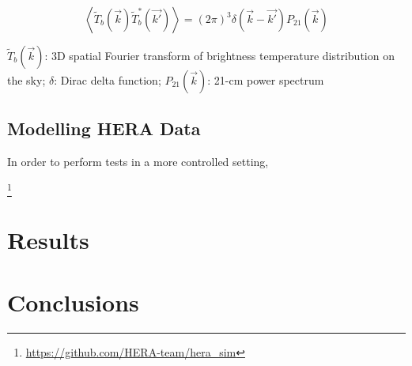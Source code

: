 \documentclass[12pt]{article}
\begin{document}
\begin{equation}
\left\langle \widetilde{T}_b\left(\vec{k}\right) \widetilde{T}_b^*\left(\vec{k'}\right) \right\rangle = \left(2\pi\right)^3 \delta\left(\vec{k} - \vec{k'}\right) P_{21}\left(\vec{k}\right)
\label{eqn:P21}
\end{equation}

$\widetilde{T}_b\left(\vec{k}\right)$: 3D spatial Fourier transform of brightness temperature distribution on the sky; $\delta$: Dirac delta function; $P_{21}\left(\vec{k}\right)$: 21-cm power spectrum



\subsection{Modelling HERA Data} \label{subsec:modelling}

In order to perform tests in a more controlled setting, 

\herasim\footnote{\url{https://github.com/HERA-team/hera_sim}}


\section{Results}

\section{Conclusions}



\end{document}
